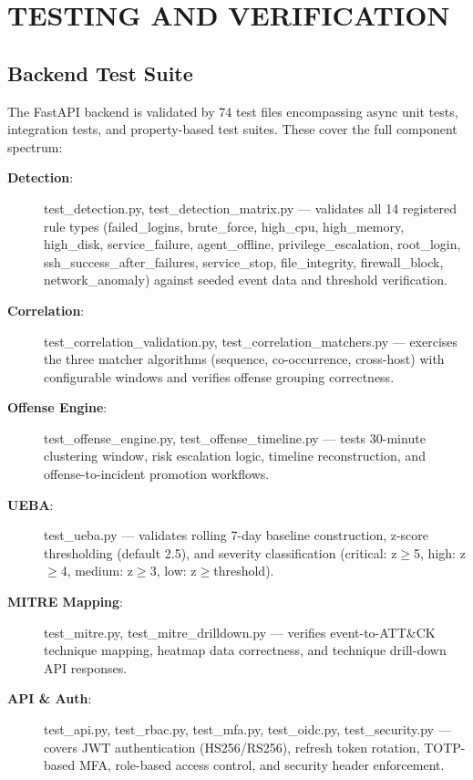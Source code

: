 \chapter{TESTING AND VERIFICATION}
\label{ch:testing_verification}

\section{Backend Test Suite}
The FastAPI backend is validated by 74 test files encompassing async unit tests, integration tests, and property-based test suites. These cover the full component spectrum:

\begin{description}
    \item[\textbf{Detection}:] test\_detection.py, test\_detection\_matrix.py — validates all 14 registered rule types (failed\_logins, brute\_force, high\_cpu, high\_memory, high\_disk, service\_failure, agent\_offline, privilege\_escalation, root\_login, ssh\_success\_after\_failures, service\_stop, file\_integrity, firewall\_block, network\_anomaly) against seeded event data and threshold verification.
    \item[\textbf{Correlation}:] test\_correlation\_validation.py, test\_correlation\_matchers.py — exercises the three matcher algorithms (sequence, co-occurrence, cross-host) with configurable windows and verifies offense grouping correctness.
    \item[\textbf{Offense Engine}:] test\_offense\_engine.py, test\_offense\_timeline.py — tests 30-minute clustering window, risk escalation logic, timeline reconstruction, and offense-to-incident promotion workflows.
    \item[\textbf{UEBA}:] test\_ueba.py — validates rolling 7-day baseline construction, z-score thresholding (default 2.5), and severity classification (critical: z$\geq$5, high: z$\geq$4, medium: z$\geq$3, low: z$\geq$threshold).
    \item[\textbf{MITRE Mapping}:] test\_mitre.py, test\_mitre\_drilldown.py — verifies event-to-ATT\&CK technique mapping, heatmap data correctness, and technique drill-down API responses.
    \item[\textbf{API \& Auth}:] test\_api.py, test\_rbac.py, test\_mfa.py, test\_oidc.py, test\_security.py — covers JWT authentication (HS256/RS256), refresh token rotation, TOTP-based MFA, role-based access control, and security header enforcement.

\end{description}
